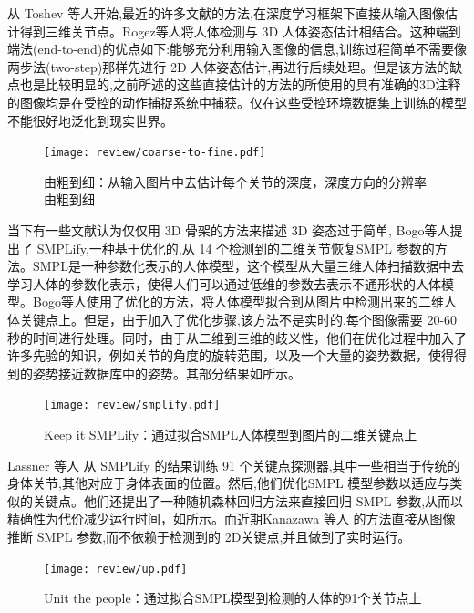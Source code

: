 \begin{refsection}
从 Toshev \cite{toshev2014deep}等人开始,最近的许多文献的方法,在深度学习框架下直接从输入图像估计得到三维关节点\cite{pavlakos2017coarse}\cite{tekin2017learning}\cite{tome2017lifting}\cite{zhou2017weaklysupervised}。Rogez\cite{rogez2016mocap}等人将人体检测与 3D 人体姿态估计相结合。这种端到端法(end-to-end)的优点如下:能够充分利用输入图像的信息,训练过程简单不需要像两步法(two-step)那样先进行 2D 人体姿态估计,再进行后续处理。但是该方法的缺点也是比较明显的,之前所述的这些直接估计的方法的所使用的具有准确的3D注释的图像均是在受控的动作捕捉系统中捕获。仅在这些受控环境数据集上训练的模型不能很好地泛化到现实世界。

\begin{figure}[ht]
    \centering
    \texttt{[image: review/coarse-to-fine.pdf]}
    \caption{由粗到细\autocite{pavlakos2017coarse}：从输入图片中去估计每个关节的深度，深度方向的分辨率由粗到细}\label{fig:c2f}
\end{figure}

当下有一些文献认为仅仅用 3D 骨架的方法来描述 3D 姿态过于简单, Bogo等人\cite{bogo2016keep}提出了 SMPLify,一种基于优化的,从 14 个检测到的二维关节恢复SMPL 参数的方法。SMPL\autocite{loper2015smpl}是一种参数化表示的人体模型，这个模型从大量三维人体扫描数据中去学习人体的参数化表示，使得人们可以通过低维的参数去表示不通形状的人体模型。Bogo等人\cite{bogo2016keep}使用了优化的方法，将人体模型拟合到从图片中检测出来的二维人体关键点上。但是，由于加入了优化步骤,该方法不是实时的,每个图像需要 20-60 秒的时间进行处理。同时，由于从二维到三维的歧义性，他们在优化过程中加入了许多先验的知识，例如关节的角度的旋转范围，以及一个大量的姿势数据，使得得到的姿势接近数据库中的姿势。其部分结果如所示。 

\begin{figure}[ht]
    \centering
    \texttt{[image: review/smplify.pdf]}
    \caption{Keep it SMPLify\autocite{bogo2016keep}：通过拟合SMPL人体模型到图片的二维关键点上}\label{fig:smpl}
\end{figure}

Lassner \cite{lassner2017unite} 等人 从 SMPLify 的结果训练 91 个关键点探测器,其中一些相当于传统的身体关节,其他对应于身体表面的位置。然后,他们优化SMPL 模型参数以适应与\cite{bogo2016keep}类似的关键点。他们还提出了一种随机森林回归方法来直接回归 SMPL 参数,从而以精确性为代价减少运行时间，如所示。而近期Kanazawa 等人\cite{kanazawa2018end} 的方法直接从图像推断 SMPL 参数,而不依赖于检测到的 2D关键点,并且做到了实时运行。

\begin{figure}[ht]
    \centering
    \texttt{[image: review/up.pdf]}
    \caption{Unit the people\autocite{lassner2017unite}：通过拟合SMPL模型到检测的人体的91个关节点上}\label{fig:up}
\end{figure}


\newpage
\printbibliography
\end{refsection}
